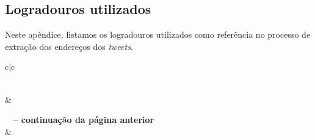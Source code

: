 \documentclass[
	12pt,				%
	oneside,			%
	a4paper,			%
	english,			%
	brazil				%
	]{abntex2ppgsi}
\begin{document}
{{{\begin{apendicesenv}
\clearpage

\chapter{Logradouros utilizados}
\label{apendiceB}

Neste apêndice, listamos os logradouros utilizados como referência no processo de extração dos endereços dos \textit{tweets}.

\begin{longtable}{c|c}
\caption{Tabela de logradouros com abreviaturas}
\label{tab:logradouros}\\

\hline {} &  \\ \hline 
\endfirsthead

%
{{\bfseries \tablename\ \thetable{} -- continuação da página anterior}} \\
\hline {} &   \\ \hline 
\endhead

\hline {} \\
\endfoot

\hline \hline
\endlastfoot


\end{longtable}
\end{apendicesenv}}}}
\end{document}
